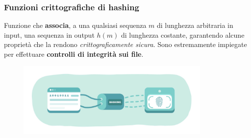 \documentclass{beamer}
\begin{document}
\begin{frame}
	\frametitle{Funzioni crittografiche di hashing}
	Funzione che \textbf{associa},
	a una qualsiasi sequenza \(m\) di lunghezza arbitraria in input, una sequenza
	in output \(h(m)\) di lunghezza costante,
	garantendo alcune proprietà che la rendono
	\emph{crittograficamente sicura}.
	Sono estremamente impiegate per effettuare \textbf{controlli di integrità sui file}.
	\begin{figure}
		\includegraphics[width=0.85\textwidth]{figures/hashing.jpg}
	\end{figure}
\end{frame}
\end{document}
